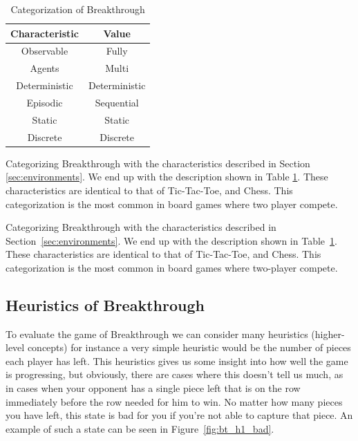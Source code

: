 \begin{table}[h]
  \centering
  \begin{tabular}{|c|c|}\hline
    \textbf{Characteristic} & \textbf{Value} \\\hline
    Observable              & Fully          \\
    Agents                  & Multi          \\
    Deterministic           & Deterministic  \\
    Episodic                & Sequential     \\
    Static                  & Static         \\
    Discrete                & Discrete       \\\hline
  \end{tabular}
  \caption{Categorization of Breakthrough}
  \label{tab:breakthrough_cat}
\end{table}

Categorizing Breakthrough with the characteristics described in Section \ref{sec:environments}. We end up with the description
shown in Table \ref{tab:breakthrough_cat}. These characteristics are identical to that of Tic-Tac-Toe, and Chess.
This categorization is the most common in board games where two player compete.

Categorizing Breakthrough with the characteristics described in Section~\ref{sec:environments}. We end up with the description shown in Table~\ref{tab:breakthrough_cat}. These characteristics are identical to that of Tic-Tac-Toe, and Chess. This categorization is the most common in board games where two-player compete.

\subsection{Heuristics of Breakthrough}

To evaluate the game of Breakthrough we can consider many heuristics (higher-level concepts) for instance a very simple heuristic would be the number of pieces each player has left. This heuristics gives us some insight into how well the game is progressing, but obviously, there are cases where this doesn't tell us much, as in cases when your opponent has a single piece left that is on the row immediately before the row needed for him to win. No matter how many pieces you have left, this state is bad for you if you're not able to capture that piece. An example of such a state can be seen in Figure~\ref{fig:bt_h1_bad}.

